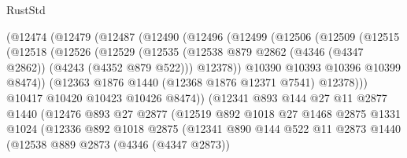 \begin{lexlean}{RustStd}
\begin{coremodule}
                (@12474
                  (@12479
                    (@12487
                      (@12490
                        (@12496
                          (@12499
                            (@12506
                              (@12509
                                (@12515
                                  (@12518
                                    (@12526
                                      (@12529
                                        (@12535
                                          (@12538
                                            @879
                                            @2862
                                            (@4346 (@4347 @2862))
                                            (@4243 (@4352 @879 @522)))
                                          @12378))
                                      @10390
                                      @10393
                                      @10396
                                      @10399
                                      @8474))
                                  (@12363 @1876 @1440 (@12368 @1876 @12371 @7541) @12378)))
                              @10417
                              @10420
                              @10423
                              @10426
                              @8474))
                          (@12341
                            @893
                            @144
                            @27
                            @11
                            @2877
                            @1440
                            (@12476
                              @893
                              @27
                              @2877
                              (@12519
                                @892
                                @1018
                                @27
                                @1468
                                @2875
                                @1331
                                @1024
                                (@12336
                                  @892
                                  @1018
                                  @2875
                                  (@12341
                                    @890
                                    @144
                                    @522
                                    @11
                                    @2873
                                    @1440
                                    (@12538
                                      @889
                                      @2873
                                      (@4346 (@4347 @2873))

\end{coremodule}
\end{lexlean}
